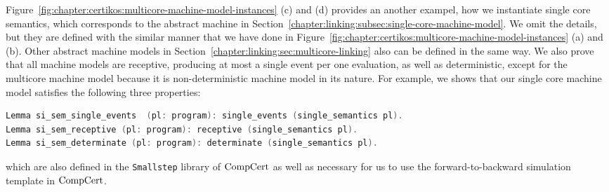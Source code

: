 Figure~\ref{fig:chapter:certikos:multicore-machine-model-instances} (c) and (d) provides an another exampel, 
how 
we instantiate single core semantics, which corresponds to the abstract machine in Section~\ref{chapter:linking:subsec:single-core-machine-model}.
We omit the details, but they are defined with the similar manner that we have done in Figure~\ref{fig:chapter:certikos:multicore-machine-model-instances} (a) and (b). 
Other abstract machine models 
in Section~\ref{chapter:linking:sec:multicore-linking} also can be defined 
in the same way. 
We also prove that all machine models 
are receptive, producing at most a single event per one evaluation, as well as deterministic, 
except for the multicore machine model because it is non-deterministic machine model in its nature.
For example, 
we shows that
our single core machine model satisfies the following three properties:
\begin{lstlisting}[language=C]
Lemma si_sem_single_events  (pl: program): single_events (single_semantics pl).
Lemma si_sem_receptive (pl: program): receptive (single_semantics pl).
Lemma si_sem_determinate (pl: program): determinate (single_semantics pl).
\end{lstlisting}
which are also defined in  the \lstinline$Smallstep$ library of $\mathrm{CompCert}$ as well as 
necessary for us to use 
the forward-to-backward simulation template in $\mathrm{CompCert}$. 

%
%
%

%    
%    

